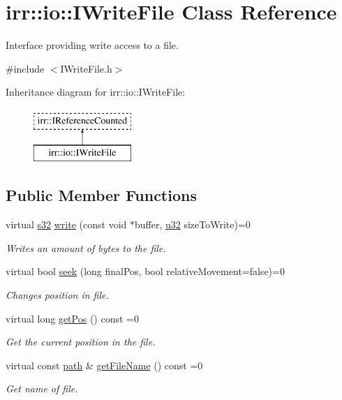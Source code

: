 \hypertarget{classirr_1_1io_1_1IWriteFile}{}\section{irr\+:\+:io\+:\+:I\+Write\+File Class Reference}
\label{classirr_1_1io_1_1IWriteFile}


Interface providing write access to a file.  




{\ttfamily \#include $<$I\+Write\+File.\+h$>$}

Inheritance diagram for irr\+:\+:io\+:\+:I\+Write\+File\+:\begin{figure}[H]
\begin{center}
\leavevmode
\includegraphics[height=2.000000cm]{classirr_1_1io_1_1IWriteFile}
\end{center}
\end{figure}
\subsection*{Public Member Functions}
\begin{DoxyCompactItemize}
\item 
virtual \hyperlink{namespaceirr_ac66849b7a6ed16e30ebede579f9b47c6}{s32} \hyperlink{classirr_1_1io_1_1IWriteFile_a32ce2fb186c4a21fcf3c85adb13c7c77}{write} (const void $\ast$buffer, \hyperlink{namespaceirr_a0416a53257075833e7002efd0a18e804}{u32} size\+To\+Write)=0
\begin{DoxyCompactList}\small\item\em Writes an amount of bytes to the file. \end{DoxyCompactList}\item 
virtual bool \hyperlink{classirr_1_1io_1_1IWriteFile_ad68289024b2a2079fce20ca9b95c9519}{seek} (long final\+Pos, bool relative\+Movement=false)=0
\begin{DoxyCompactList}\small\item\em Changes position in file. \end{DoxyCompactList}\item 
virtual long \hyperlink{classirr_1_1io_1_1IWriteFile_a062eaf082b6f4d05cf0e44b85aa7a6ab}{get\+Pos} () const =0
\begin{DoxyCompactList}\small\item\em Get the current position in the file. \end{DoxyCompactList}\item 
virtual const \hyperlink{namespaceirr_1_1io_ab1bdc45edb3f94d8319c02bc0f840ee1}{path} \& \hyperlink{classirr_1_1io_1_1IWriteFile_ad129ab8feac03f06f2edf685df6a0236}{get\+File\+Name} () const =0
\begin{DoxyCompactList}\small\item\em Get name of file. \end{DoxyCompactList}\end{DoxyCompactItemize}
